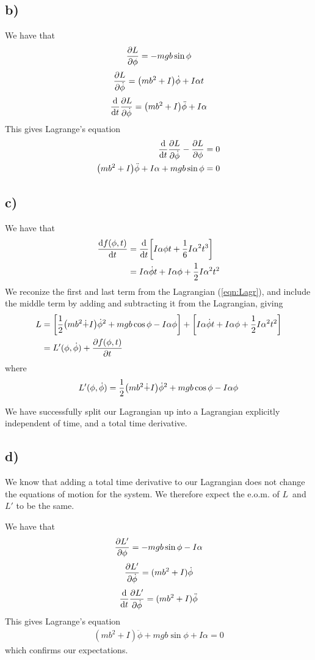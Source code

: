 \documentclass[12p,a4paper]{article}
\newcommand{\half}{\frac{1}{2}}
\begin{document}
\subsection*{b)}
We have that
\[
    \pdv{L}{\phi} = -mgb\sin{\phi}
\]
\[
    \pdv{L}{\dot{\phi}} = \qty(mb^2 + I)\dot{\phi} + I \alpha t
\]
\[
    \dv{t}\pdv{L}{\dot{\phi}} = \qty(mb^2 + I)\ddot{\phi} + I\alpha
\]
This gives Lagrange's equation
\begin{align*}
    \dv{t}\pdv{L}{\dot{\phi}} - \pdv{L}{\phi} = 0 \\
    \qty(mb^2 + I)\ddot{\phi} + I\alpha + mgb\sin{\phi} = 0
\end{align*}


\subsection*{c)}
We have that
\begin{align*}
    \dv{f(\phi, t)}{t} &= \dv{t}\qty[I\alpha\phi t + \frac{1}{6} I \alpha^2t^3] \\
    &= I\alpha\dot{\phi}t + I\alpha\phi + \half I \alpha^2t^2
\end{align*}
We reconize the first and last term from the Lagrangian (\ref{eqn:Lagr}), and include the middle term by adding and subtracting it from the Lagrangian, giving
\begin{align*}
    L &= \qty[ \half \qty(m b^2\dot + I)\dot{\phi}^2 + mgb\cos{\phi} - I\alpha\phi ] + \qty[ I\alpha\dot{\phi}t + I\alpha\phi + \half I \alpha^2t^2 ] \\
    &= L'(\phi, \dot{\phi}) + \pdv{f(\phi, t)}{t}
\end{align*}
where
\begin{align*}
    L'(\phi, \dot{\phi}) = \half \qty(m b^2\dot + I)\dot{\phi}^2 + mgb\cos{\phi} - I\alpha\phi
\end{align*}

We have successfully split our Lagrangian up into a Lagrangian explicitly independent of time, and a total time derivative.



\subsection*{d)}
We know that adding a total time derivative to our Lagrangian does not change the equations of motion for the system. We therefore expect the e.o.m. of $L$ and $L'$ to be the same.

We have that
\begin{align*}
    \pdv{L'}{\phi} = -mgb\sin{\phi} - I\alpha
\end{align*}
\begin{align*}
    \pdv{L'}{\dot{\phi}} = (mb^2 + I)\dot{\phi}
\end{align*}
\begin{align*}
    \dv{t}\pdv{L'}{\dot{\phi}} = (mb^2 + I)\ddot{\phi}
\end{align*}
This gives Lagrange's equation
\begin{align*}
    (mb^2 + I)\ddot{\phi} + mgb\sin{\phi} + I\alpha = 0
\end{align*}
which confirms our expectations.
\end{document}
